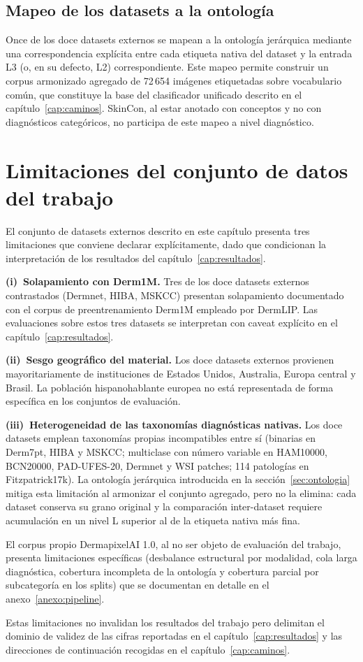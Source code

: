 \subsection{Mapeo de los datasets a la ontología}
\label{sec:ontologia-mapeo}

Once de los doce datasets externos se mapean a la ontología
jerárquica mediante una correspondencia explícita entre cada
etiqueta nativa del dataset y la entrada L3 (o, en su defecto, L2)
correspondiente. Este mapeo permite construir un corpus armonizado
agregado de 72\,654 imágenes etiquetadas sobre vocabulario común,
que constituye la base del clasificador unificado descrito en el
capítulo~\ref{cap:caminos}. SkinCon, al estar anotado con conceptos
y no con diagnósticos categóricos, no participa de este mapeo a
nivel diagnóstico.

\section{Limitaciones del conjunto de datos del trabajo}
\label{sec:limitaciones-datos}

El conjunto de datasets externos descrito en este capítulo presenta
tres limitaciones que conviene declarar explícitamente, dado que
condicionan la interpretación de los resultados del
capítulo~\ref{cap:resultados}.

\textbf{(i)~Solapamiento con Derm1M.} Tres de los doce datasets
externos contrastados (Dermnet, HIBA, MSKCC) presentan solapamiento
documentado con el corpus de preentrenamiento Derm1M empleado por
DermLIP. Las evaluaciones sobre estos tres datasets se interpretan
con caveat explícito en el capítulo~\ref{cap:resultados}.

\textbf{(ii)~Sesgo geográfico del material.} Los doce datasets
externos provienen mayoritariamente de instituciones de Estados
Unidos, Australia, Europa central y Brasil. La población
hispanohablante europea no está representada de forma específica en
los conjuntos de evaluación.

\textbf{(iii)~Heterogeneidad de las taxonomías diagnósticas
nativas.} Los doce datasets emplean taxonomías propias incompatibles
entre sí (binarias en Derm7pt, HIBA y MSKCC; multiclase con número
variable en HAM10000, BCN20000, PAD-UFES-20, Dermnet y WSI patches;
114 patologías en Fitzpatrick17k). La ontología jerárquica
introducida en la sección~\ref{sec:ontologia} mitiga esta
limitación al armonizar el conjunto agregado, pero no la elimina:
cada dataset conserva su grano original y la comparación
inter-dataset requiere acumulación en un nivel L superior al de la
etiqueta nativa más fina.

El corpus propio DermapixelAI 1.0, al no ser objeto de evaluación
del trabajo, presenta limitaciones específicas (desbalance
estructural por modalidad, cola larga diagnóstica, cobertura
incompleta de la ontología y cobertura parcial por subcategoría en
los splits) que se documentan en detalle en el
anexo~\ref{anexo:pipeline}.

Estas limitaciones no invalidan los resultados del trabajo pero
delimitan el dominio de validez de las cifras reportadas en el
capítulo~\ref{cap:resultados} y las direcciones de continuación
recogidas en el capítulo~\ref{cap:caminos}.
